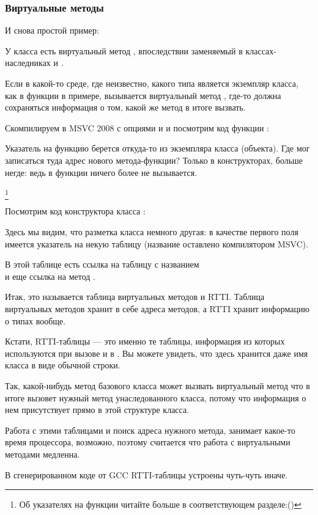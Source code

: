 \subsubsection{Виртуальные методы}

И снова простой пример:



У класса  есть виртуальный метод , 
впоследствии заменяемый в классах-наследниках  и .


Если в какой-то среде, где неизвестно, какого типа является экземпляр класса, как в функции \main в примере, 
вызывается виртуальный метод , где-то должна сохраняться информация о том, какой же метод в итоге 
вызвать.


Скомпилируем в MSVC 2008 с опциями \Ox и \Obzero и посмотрим код функции \main:




Указатель на функцию  берется откуда-то из экземпляра класса (объекта). 
Где мог записаться туда адрес нового метода-функции?
Только в конструкторах, больше негде: ведь в функции \main ничего более не вызывается.

\footnote{Об указателях на функции читайте больше в соответствующем разделе:()}

Посмотрим код конструктора класса :




Здесь мы видим, что разметка класса немного другая: в качестве первого поля имеется указатель 
на некую таблицу  (название оставлено компилятором MSVC).


\label{RTTI}
В этой таблице есть ссылка на таблицу с названием \\
 и еще ссылка на 
метод .

Итак, это называется таблица виртуальных методов и \ac{RTTI}.
Таблица виртуальных методов хранит в себе адреса методов, а \ac{RTTI} хранит информацию о типах вообще.

Кстати, \ac{RTTI}-таблицы --- это именно те таблицы, информация из которых используются при вызове  и  в \Cpp. 
Вы можете увидеть, что здесь хранится даже имя класса в виде обычной строки.

Так, какой-нибудь метод базового класса  может вызвать виртуальный метод  что 
в итоге вызовет нужный метод унаследованного класса, потому что информация о нем присутствует прямо в этой 
структуре класса.


Работа с этими таблицами и поиск адреса нужного метода, занимает какое-то время процессора, возможно, 
поэтому считается что работа с виртуальными методами медленна.


В сгенерированном коде от GCC \ac{RTTI}-таблицы устроены чуть-чуть иначе.


